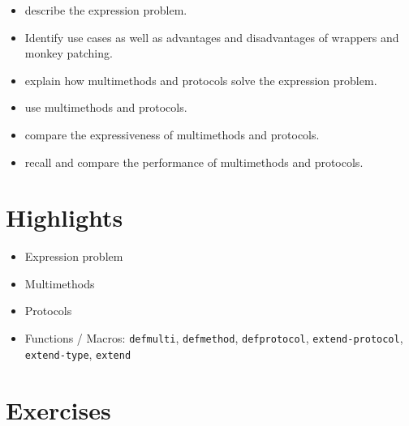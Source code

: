 \documentclass[11pt,a4paper]{article}
\begin{document}
\begin{itemize}
    \item describe the expression problem.
    \item Identify use cases as well as advantages and disadvantages of wrappers and monkey patching.
    \item explain how multimethods and protocols solve the expression problem.
    \item use multimethods and protocols.
    \item compare the expressiveness of multimethods and protocols.
    \item recall and compare the performance of multimethods and protocols.
\end{itemize}

\section{Highlights}

\begin{itemize}
    \item Expression problem
    \item Multimethods
    \item Protocols
    \item Functions / Macros: \verb|defmulti|, \verb|defmethod|, \verb|defprotocol|, \verb|extend-protocol|, \verb|extend-type|, \verb|extend|
\end{itemize}



\section{Exercises}
\end{document}
